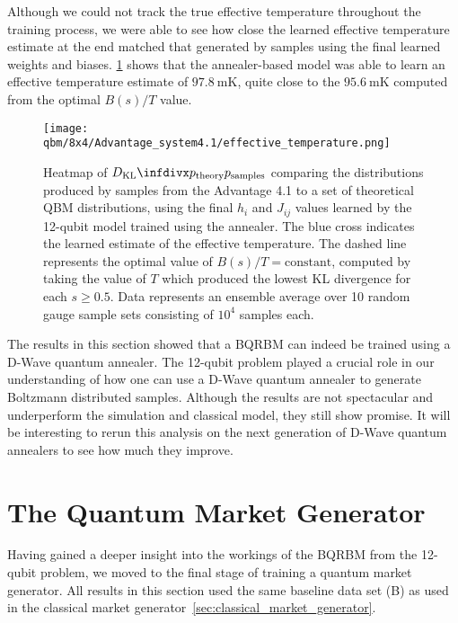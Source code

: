 Although we could not track the true effective temperature throughout the training process, we were able to see how close the learned effective temperature estimate at the end matched that generated by samples using the final learned weights and biases.
\cref{fig:learned_effective_temperature} shows that the annealer-based model was able to learn an effective temperature estimate of \( 97.8 \ \si{\milli\kelvin} \), quite close to the \( 95.6 \ \si{\milli\kelvin} \) computed from the optimal \( B(s) / T \) value.
\begin{figure}[!htb]
    \begin{center}
        \texttt{[image: qbm/8x4/Advantage\_system4.1/effective\_temperature.png]}
    \end{center}
    \caption{
        Heatmap of \( \DKL{\ptheory}{\psamples} \) comparing the distributions produced by samples from the Advantage 4.1 to a set of theoretical QBM distributions, using the final \( h_i \) and \( J_{ij} \) values learned by the 12-qubit model trained using the annealer.
        The blue cross indicates the learned estimate of the effective temperature.
        The dashed line represents the optimal value of \( B(s) / T = \text{constant} \), computed by taking the value of \( T \) which produced the lowest KL divergence for each \( s \ge 0.5 \).
        Data represents an ensemble average over 10 random gauge sample sets consisting of \( 10^4 \) samples each.
    }
    \label{fig:learned_effective_temperature}
\end{figure}

The results in this section showed that a BQRBM can indeed be trained using a D-Wave quantum annealer.
The 12-qubit problem played a crucial role in our understanding of how one can use a D-Wave quantum annealer to generate Boltzmann distributed samples.
Although the results are not spectacular and underperform the simulation and classical model, they still show promise.
It will be interesting to rerun this analysis on the next generation of D-Wave quantum annealers to see how much they improve.

\section{The Quantum Market Generator}\label{sec:quantum_market_generator}
Having gained a deeper insight into the workings of the BQRBM from the 12-qubit problem, we moved to the final stage of training a quantum market generator.
All results in this section used the same baseline data set (B) as used in the classical market generator~\cref{sec:classical_market_generator}.

